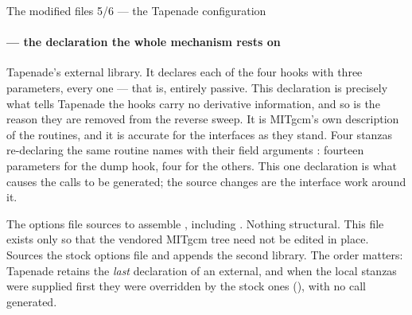 \begin{frame}{The modified files 5/6 --- the Tapenade configuration}
  \framesubtitle{ --- the declaration the whole mechanism rests on}

{Tapenade's external library. It declares each of the four hooks with three
parameters, every one  --- that is, entirely passive.}
{This declaration is precisely what tells Tapenade the hooks carry no
derivative information, and so is the reason they are removed from the reverse
sweep. It is MITgcm's own description of the routines, and it is accurate for
the interfaces as they stand.}
{Four stanzas re-declaring the same routine names with their field arguments
: fourteen parameters for the dump hook, four for the
others. This one declaration is what causes the  calls to be
generated; the source changes are the interface work around it.}

{The  options file  sources to assemble
, including .}
{Nothing structural. This file exists only so that the vendored MITgcm tree
need not be edited in place.}
{Sources the stock options file and appends the second  library.
The order matters: Tapenade retains the \emph{last} declaration of an external,
and when the local stanzas were supplied first they were overridden by the
stock ones (), with no 
call generated.}

\end{frame}


